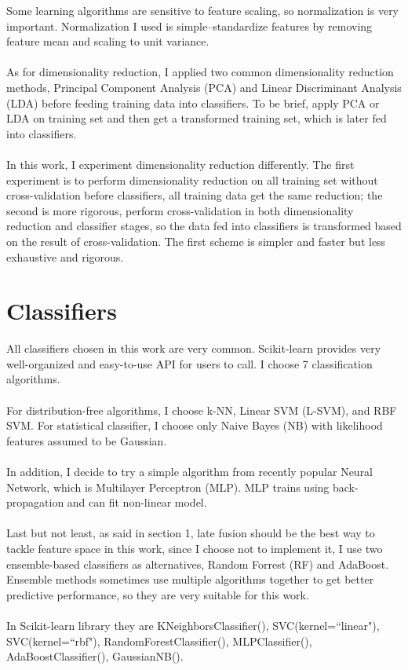 \documentclass[11pt,a4paper]{article}
\begin{document}
Some learning algorithms are sensitive to feature scaling, so normalization is very important. Normalization I used is simple--standardize features by removing feature mean and scaling to unit variance.\\\\
As for dimensionality reduction, I applied two common dimensionality reduction methods, Principal Component Analysis (PCA) and Linear Discriminant Analysis (LDA) before feeding training data into classifiers. To be brief, apply PCA or LDA on training set and then get a transformed training set, which is later fed into classifiers.\\\\
In this work, I experiment dimensionality reduction differently. The first experiment is to perform dimensionality reduction on all training set without cross-validation before classifiers, all training data get the same reduction; the second is more rigorous, perform cross-validation in both dimensionality reduction and classifier stages, so the data fed into classifiers is transformed based on the result of cross-validation. The first scheme is simpler and faster but less exhaustive and rigorous.

\section{Classifiers} 

All classifiers chosen in this work are very common. Scikit-learn provides very well-organized and easy-to-use API for users to call. I choose 7 classification algorithms. \\\\
For distribution-free algorithms, I choose k-NN, Linear SVM (L-SVM), and RBF SVM. For statistical classifier, I choose only Naive Bayes (NB) with likelihood features assumed to be Gaussian. \\\\
In addition, I decide to try a simple algorithm from recently popular Neural Network, which is Multilayer Perceptron (MLP). MLP trains using back-propagation and can fit non-linear model.\\\\
Last but not least, as said in section 1, late fusion should be the best way to tackle feature space in this work, since I choose not to implement it, I use two ensemble-based classifiers as alternatives, Random Forrest (RF) and AdaBoost. Ensemble methods sometimes use multiple algorithms together to get better predictive performance, so they are very suitable for this work.\\\\
In Scikit-learn library they are KNeighborsClassifier(), SVC(kernel=``linear"), SVC(kernel=``rbf"), RandomForestClassifier(), MLPClassifier(), AdaBoostClassifier(), GaussianNB().
\end{document}
